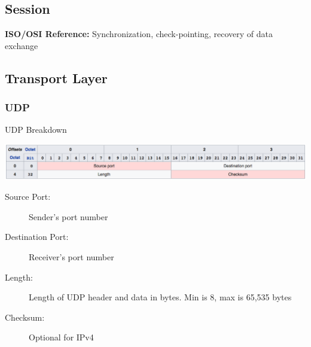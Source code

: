 \subsection{Session}
\textbf{ISO/OSI Reference:} Synchronization, check-pointing, recovery of data exchange

\subsection{Transport Layer}
\subsubsection{UDP}
\begin{table}[H]
	\centering
	\caption{UDP Breakdown}
	\includegraphics[width=\linewidth]{udp}
\end{table}
\begin{description}
	\item[Source Port:] Sender's port number
	\item[Destination Port:] Receiver's port number
	\item[Length:] Length of UDP header and data in bytes. Min is 8, max is 65,535 bytes
	\item[Checksum:] Optional for IPv4
\end{description}
